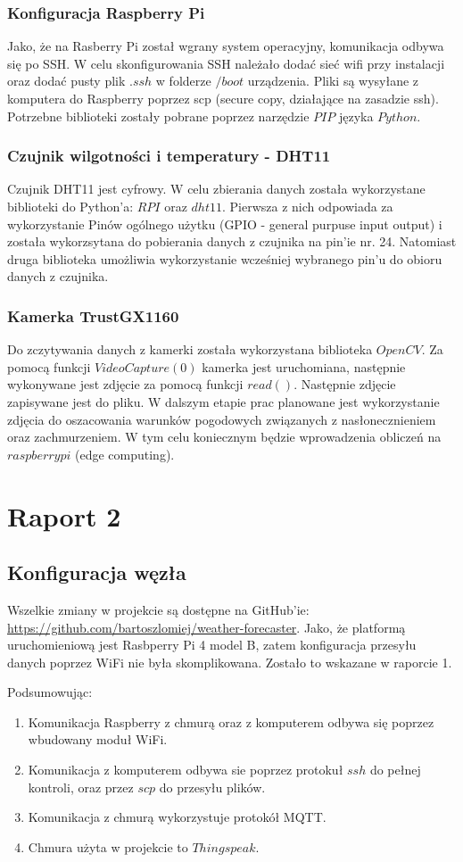 \documentclass{article}
\begin{document}
\subsubsection{Konfiguracja Raspberry Pi}
Jako, że na Rasberry Pi został wgrany system operacyjny, komunikacja odbywa się po SSH. W celu skonfigurowania SSH należało dodać sieć wifi przy instalacji oraz dodać pusty plik $.ssh$ w folderze $/boot$ urządzenia. Pliki są wysyłane z komputera do Raspberry poprzez scp (secure copy, działające na zasadzie ssh). Potrzebne biblioteki zostały pobrane poprzez narzędzie $PIP$ języka $Python$.
\subsubsection{Czujnik wilgotności i temperatury - DHT11}
Czujnik DHT11 jest cyfrowy. W celu zbierania danych została wykorzystane biblioteki do Python'a: $RPI$ oraz $dht11$. Pierwsza z nich odpowiada za wykorzystanie Pinów ogólnego użytku (GPIO - general purpuse input output) i została wykorzsytana do pobierania danych z czujnika na pin'ie nr. 24. Natomiast druga biblioteka umożliwia wykorzystanie wcześniej wybranego pin'u do obioru danych z czujnika.
\subsubsection{Kamerka TrustGX1160}
Do zczytywania danych z kamerki została wykorzystana biblioteka $OpenCV$. Za pomocą funkcji $VideoCapture(0)$ kamerka jest uruchomiana, następnie wykonywane jest zdjęcie za pomocą funkcji $read()$. Następnie zdjęcie zapisywane jest do pliku. W dalszym etapie prac planowane jest wykorzystanie zdjęcia do oszacowania warunków pogodowych związanych z nasłonecznieniem oraz zachmurzeniem. W tym celu koniecznym będzie wprowadzenia obliczeń na $raspberry pi$ (edge computing).
\newpage
\section{Raport 2}
\subsection{Konfiguracja węzła}
Wszelkie zmiany w projekcie są dostępne na GitHub'ie: \url{https://github.com/bartoszlomiej/weather-forecaster}.
Jako, że platformą uruchomieniową jest Rasbperry Pi 4 model B, zatem konfiguracja przesyłu danych poprzez WiFi nie była skomplikowana. Zostało to wskazane w raporcie 1.

Podsumowując:
\begin{enumerate}
\item Komunikacja Raspberry z chmurą oraz z komputerem odbywa się poprzez wbudowany moduł WiFi.
\item Komunikacja z komputerem odbywa sie poprzez protokuł $ssh$ do pełnej kontroli, oraz przez $scp$ do przesyłu plików.
\item Komunikacja z chmurą wykorzystuje protokół MQTT.
\item Chmura użyta w projekcie to $Thingspeak$.
\end{enumerate}
\end{document}
